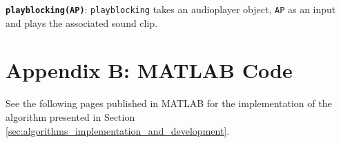\documentclass[fleqn,10pt]{../SelfArx} %
\begin{document}
\noindent \texttt{\textbf{playblocking(AP)}}: \texttt{playblocking} takes an audioplayer object, \texttt{AP} as an input and plays the associated sound clip.
\vskip 0.3cm




\section*{Appendix B: MATLAB Code}
See the following pages published in MATLAB for the implementation of the algorithm presented in Section \ref{sec:algorithms_implementation_and_development}.




% 
% 

\end{document}
